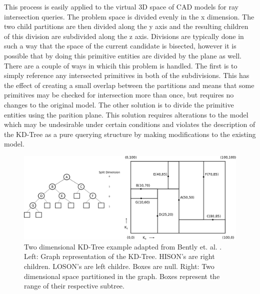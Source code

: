 \documentclass[12pt, a4paper]{article}
\begin{document}
This process is easily applied to the virtual 3D space of CAD models for ray intersection queries. The problem space is divided evenly in the x dimension. The two child partitions are then divided along the y axis and the resulting children of this division are subdivided along the z axis. Divisions are typically done in such a way that the space of the current candidate is bisected, however it is possible that by doing this primitive entities are divided by the plane as well. There are a couple of ways in whicih this problem is handled. The first is to simply reference any intersected primitives in both of the subdivisions. This has the effect of creating a small overlap between the partitions and means that some primitives may be checked for intersection more than once, but requires no changes to the original model. The other solution is to divide the primitive entities using the parition plane.  This solution requires alterations to the model which may be undesirable under certain conditions and violates the description of the KD-Tree as a pure querying structure by making modifications to the existing model.

\begin{figure}[H]

  \includegraphics[scale=0.25]{2d_kd_eg.png}
  \caption{Two dimensional KD-Tree example adapted from Bently et. al. \cite{Bentley_1975}. Left: Graph representation of the KD-Tree. HISON's are right children. LOSON's are left childre. Boxes are null. Right: Two dimensional space partitioned in the graph. Boxes represent the range of their respective subtree.}
  \label{2dkd}
\end{figure}
\end{document}
